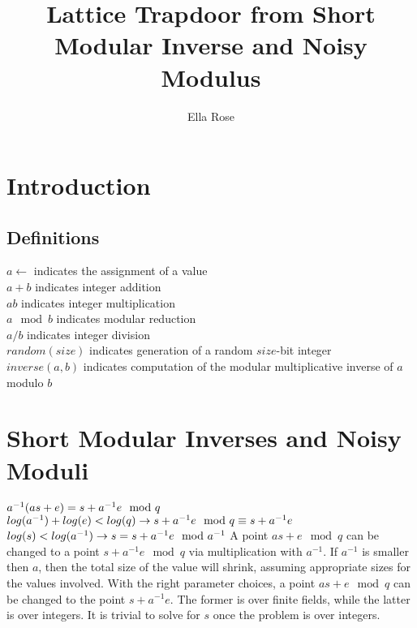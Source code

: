 \documentclass[preprint]{iacrtrans}
\author{Ella Rose}
\institute{Paso Robles, CA \email{python_pride@protonmail.com}}
\title[Lattice Trapdoor from Short Modular Inverse and Noisy Modulus]{Lattice Trapdoor from Short Modular Inverse and Noisy Modulus}
\begin{document}
\maketitle


\begin{abstract}

 \end{abstract}

\section{Introduction}

\subsection{Definitions}
$a \leftarrow$ indicates the assignment of a value\\
$a + b$ indicates integer addition\\
$a b$ indicates integer multiplication\\
$a \mod b$ indicates modular reduction\\
$a / b$ indicates integer division\\
$random(size)$ indicates generation of a random $size$-bit integer\\
$inverse(a, b)$ indicates computation of the modular multiplicative inverse of $a$ modulo $b$\\

\section{Short Modular Inverses and Noisy Moduli}
$a^{-1} (a s + e) = s + a^{-1} e \mod q\\$
$log(a^{-1}) + log(e) < log(q) \rightarrow s + a^{-1} e \mod q \equiv s + a^{-1} e\\$
$log(s) < log(a^{-1}) \rightarrow s = s + a^{-1} e \mod a^{-1}\\$
A point $a s + e \mod q$  can be changed to a point $s + a^{-1} e \mod q$ via multiplication with $a^{-1}$. If $a^{-1}$ is smaller then $a$, then the total size of the value will shrink, assuming appropriate sizes for the values involved. With the right parameter choices, a point $a s + e \mod q$ can be changed to the point $s + a^{-1} e$. The former is over finite fields, while the latter is over integers. It is trivial to solve for $s$ once the problem is over integers.
\end{document}
